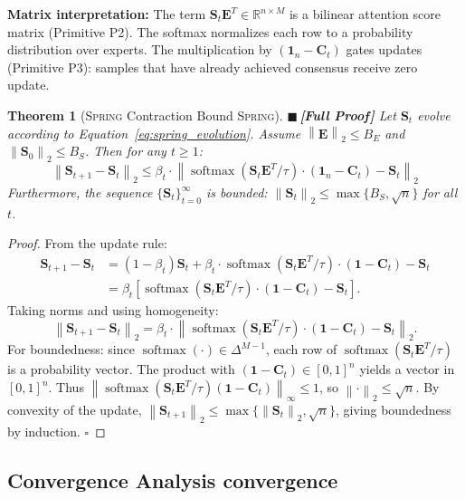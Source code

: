 \documentclass[12pt,a4paper]{article}
\newtheorem{theorem}{Theorem}[section]
\theoremstyle{definition}
\newcommand{\rigorFull}{{\color{rigorcolor}$\blacksquare$\,\textbf{[Full Proof]}}}
\newcommand{\Spring}{\textsc{Spring}}
\DeclareMathOperator{\softmax}{softmax}
\newcommand{\R}{\mathbb{R}}
\newcommand{\norm}[1]{\left\lVert#1\right\rVert}
\newcommand{\ones}{\mathbf{1}}
\newcommand{\mat}[1]{\mathbf{#1}}
\newcommand{\simplex}{\Delta}
\begin{document}
\textbf{Matrix interpretation:} The term $\mat{S}_t \mat{E}^T \in \R^{n \times M}$ 
is a bilinear attention score matrix (Primitive P2). The softmax normalizes each 
row to a probability distribution over experts. The multiplication by 
$(\ones_n - \mat{C}_t)$ gates updates (Primitive P3): samples that have already 
achieved consensus receive zero update.

\begin{theorem}[\Spring{} Contraction Bound \Spring{}]\label{thm:spring_contraction}
\rigorFull
Let $\mat{S}_t$ evolve according to Equation~\ref{eq:spring_evolution}. Assume
$\norm{\mat{E}}_2 \leq B_E$ and $\norm{\mat{S}_0}_2 \leq B_S$. Then for any $t \geq 1$:
\begin{equation}\label{eq:spring_contraction_eq}
    \norm{\mat{S}_{t+1} - \mat{S}_t}_2 \leq \beta_t \cdot \norm{\softmax(\mat{S}_t \mat{E}^T/\tau) \cdot (\ones_n - \mat{C}_t) - \mat{S}_t}_2
\end{equation}
Furthermore, the sequence $\{\mat{S}_t\}_{t=0}^\infty$ is bounded: 
$\norm{\mat{S}_t}_2 \leq \max\{B_S, \sqrt{n}\}$ for all $t$.
\end{theorem}

\begin{proof}
From the update rule:
\begin{align*}
    \mat{S}_{t+1} - \mat{S}_t &= (1-\beta_t)\mat{S}_t + \beta_t \cdot \softmax(\mat{S}_t \mat{E}^T/\tau) \cdot (\ones - \mat{C}_t) - \mat{S}_t \\
    &= \beta_t \left[\softmax(\mat{S}_t \mat{E}^T/\tau) \cdot (\ones - \mat{C}_t) - \mat{S}_t\right].
\end{align*}
Taking norms and using homogeneity:
\[
\norm{\mat{S}_{t+1} - \mat{S}_t}_2 = \beta_t \cdot \norm{\softmax(\mat{S}_t \mat{E}^T/\tau) \cdot (\ones - \mat{C}_t) - \mat{S}_t}_2.
\]
For boundedness: since $\softmax(\cdot) \in \simplex^{M-1}$, each row of 
$\softmax(\mat{S}_t \mat{E}^T/\tau)$ is a probability vector. The product with 
$(\ones - \mat{C}_t) \in [0,1]^n$ yields a vector in $[0,1]^n$. Thus 
$\norm{\softmax(\mat{S}_t \mat{E}^T/\tau)(\ones-\mat{C}_t)}_\infty \leq 1$, so 
$\norm{\cdot}_2 \leq \sqrt{n}$. By convexity of the update, 
$\norm{\mat{S}_{t+1}}_2 \leq \max\{\norm{\mat{S}_t}_2, \sqrt{n}\}$, giving boundedness
by induction. \hfill $\square$
\end{proof}

\subsection{Convergence Analysis convergence}
\end{document}
